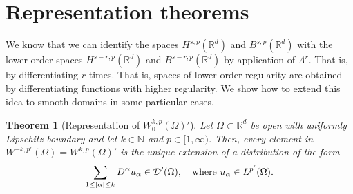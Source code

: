 \documentclass[
    a4paper,
    DIV=14,
    abstract=true,
    numbers=noenddot
]
{scrartcl}
\newtheorem{theorem}{Theorem}[section]
\theoremstyle{definition}
\newcommand{\N}{\mathbb{N}}
\newcommand{\R}{\mathbb{R}}
\newcommand{\Dd}{\mathcal{D}}
\begin{document}
\section{Representation theorems}
We know that we can identify the spaces $H^{s,p}(\R^d )$ and $B^{s,p}(\R^d )$ with the lower order spaces $H^{s-r,p}(\R^d )$ and $B^{s-r,p}(\R^d )$ by application of $\Lambda ^r$. That is, by differentiating $r$ times. That is, spaces of lower-order regularity are obtained by differentiating functions with higher regularity. We show how to extend this idea to smooth domains in some particular cases.

\begin{theorem}[Representation of $W_0^{k,p}(\Omega )'$]\label{riesz representation}
  Let $\Omega \subset \R^d$ be open with uniformly Lipschitz boundary and let  $k \in \N$ and $p \in [1,\infty)$. Then, every element in $W^{-k,p'}(\Omega )=W^{k,p}(\Omega )'$ is the unique extension of a distribution  of the form
  \begin{align*}
    \sum_{1\leq\abs{\alpha}\leq k} D^\alpha u_\alpha\in \Dd'(\Omega ),\quad \text{where }    u_\alpha \in L^{p'}(\Omega ).
  \end{align*}

\end{theorem}
\end{document}
